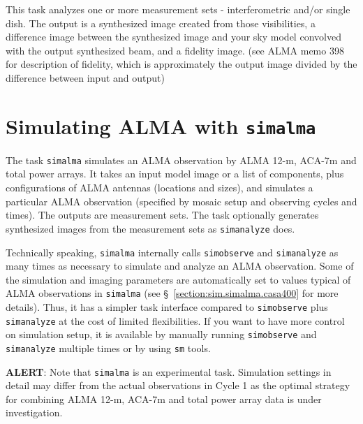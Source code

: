 This task analyzes one or more measurement sets - interferometric and/or single dish.
The output is a synthesized image created from those visibilities, a difference image
between the synthesized image and your sky model convolved with the
output synthesized beam, and a fidelity image. (see ALMA memo 398 for
description of fidelity, which is approximately the output image
divided by the difference between input and output)

\section{Simulating ALMA with {\tt simalma}}
\label{section:sim.simalma}

The task {\tt simalma} simulates an ALMA observation by ALMA 12-m, ACA-7m
and total power arrays.
It takes an input model image or a list of components, plus
configurations of ALMA antennas (locations and sizes), and simulates a
particular ALMA observation (specified by mosaic setup and
observing cycles and times).  The outputs are measurement sets.
The task optionally generates synthesized images from the measurement
sets as {\tt simanalyze} does. 

Technically speaking, {\tt simalma} internally
calls {\tt simobserve} and {\tt simanalyze} as many times as necessary
to simulate and analyze an ALMA observation.
Some of the simulation and imaging parameters are automatically set to
values typical of ALMA observations in {\tt simalma} (see
\S~\ref{section:sim.simalma.casa400} for more details). 
Thus, it has a simpler task interface compared to {\tt simobserve} plus
{\tt simanalyze} at the cost of limited flexibilities. 
If you want to have more control on simulation setup, it is available
by manually running {\tt simobserve} and {\tt simanalyze} multiple
times or by using {\tt sm} tools.

{\bf ALERT}: 
Note that {\tt simalma} is an experimental task. Simulation settings in
detail may differ from the actual observations in Cycle 1 as the optimal
strategy for combining ALMA 12-m, ACA-7m and total power array data is under
investigation.


